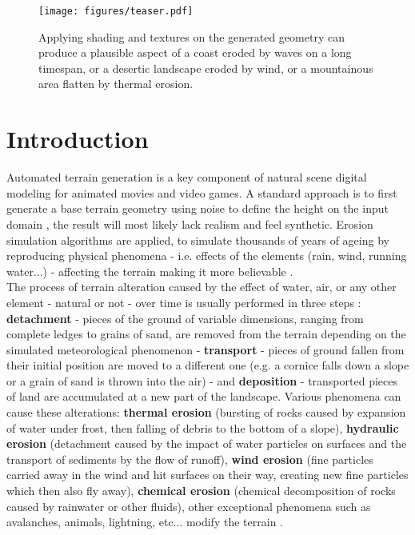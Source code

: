 \begin{figure}
	\texttt{[image: figures/teaser.pdf]}
	\centering
	\caption{Applying shading and textures on the generated geometry can produce a plausible aspect of a coast eroded by waves on a long timespan, or a desertic landscape eroded by wind, or a mountainous area flatten by thermal erosion.}
	\label{fig:erosion_closerImage}
	\label{fig:erosion_teaser}
\end{figure}

\section{Introduction}
Automated terrain generation is a key component of natural scene digital modeling for animated movies and video games. A standard approach is to first generate a base terrain geometry using noise to define the height on the input domain \cite{Musgrave1989, Olsen2004, Roudier1993}, the result will most likely lack realism and feel synthetic. Erosion simulation algorithms are applied, to simulate thousands of years of ageing by reproducing physical phenomena - i.e. effects of the elements (rain, wind, running water...) - affecting the terrain making it more believable \cite{Stachniak2005, Smelik2009, Galin2019}.\\
The process of terrain alteration caused by the effect of water, air, or any other element - natural or not - over time is usually performed in three steps \cite{Neidhold2005}: \textbf{detachment} - pieces of the ground of variable dimensions, ranging from complete ledges to grains of sand, are removed from the terrain depending on the simulated meteorological phenomenon - \textbf{transport} - pieces of ground fallen from their initial position are moved to a different one (e.g. a cornice falls down a slope or a grain of sand is thrown into the air) - and \textbf{deposition} - transported pieces of land are accumulated at a new part of the landscape. Various phenomena can cause these alterations: \textbf{thermal erosion} (bursting of rocks caused by expansion of water under frost, then falling of debris to the bottom of a slope), \textbf{hydraulic erosion} (detachment caused by the impact of water particles on surfaces and the transport of sediments by the flow of runoff), \textbf{wind erosion} (fine particles carried away in the wind and hit surfaces on their way, creating new fine particles which then also fly away), \textbf{chemical erosion} (chemical decomposition of rocks caused by rainwater or other fluids), other exceptional phenomena such as avalanches, animals, lightning, etc... modify the terrain \cite{Cordonnier2017a, Argudo2020, Cordonnier2018, Cordonnier2017b,Cordonnier2023}. 


